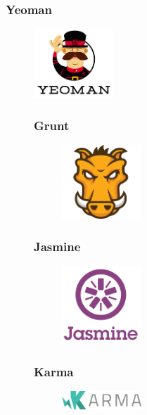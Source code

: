 \subsubsection{Yeoman}
\begin{figure}
\includegraphics[width=3cm]{img/mobile-app/logos/yeoman.png}
\cite{jasmine}

\subsubsection{Grunt}
\begin{figure}
\includegraphics[width=3cm]{img/mobile-app/logos/grunt.png}
\end{figure} 
\cite{jasmine}

\subsubsection{Jasmine}
\begin{figure}
\includegraphics[width=3cm]{img/mobile-app/logos/jasmine.png}
\end{figure} 
\cite{jasmine}

\subsubsection{Karma}
\begin{figure}
\includegraphics[width=3cm]{img/mobile-app/logos/karma.png}
\end{figure} 



\end{figure}
